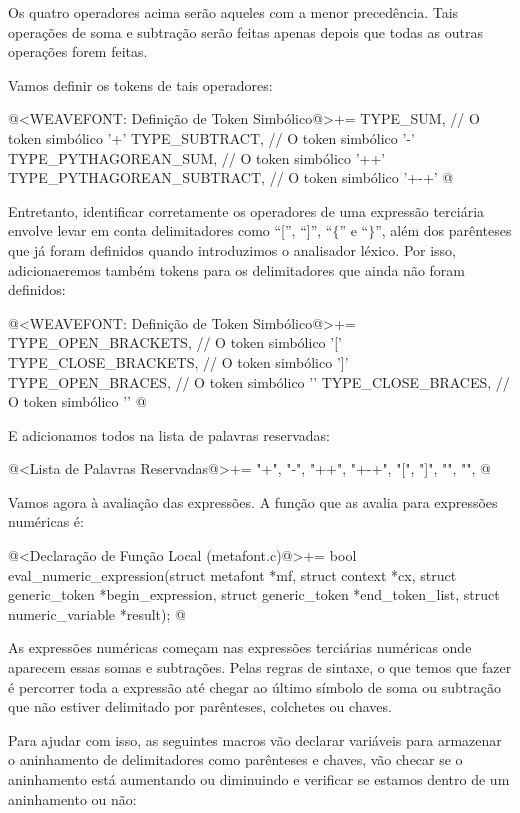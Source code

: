 Os quatro operadores acima serão aqueles com a menor precedência. Tais
operações de soma e subtração serão feitas apenas depois que todas as
outras operações forem feitas.

Vamos definir os tokens de tais operadores:

\iniciocodigo
@<WEAVEFONT: Definição de Token Simbólico@>+=
TYPE_SUM,                   // O token simbólico '+'
TYPE_SUBTRACT,              // O token simbólico '-'
TYPE_PYTHAGOREAN_SUM,       // O token simbólico '++'
TYPE_PYTHAGOREAN_SUBTRACT,  // O token simbólico '+-+'
@
\fimcodigo

Entretanto, identificar corretamente os operadores de uma expressão
terciária envolve levar em conta delimitadores como ``['', ``]'',
``$\{$'' e ``$\}$'', além dos parênteses que já foram definidos quando
introduzimos o analisador léxico. Por isso, adicionaeremos também
tokens para os delimitadores que ainda não foram definidos:

\iniciocodigo
@<WEAVEFONT: Definição de Token Simbólico@>+=
TYPE_OPEN_BRACKETS,         // O token simbólico '['
TYPE_CLOSE_BRACKETS,        // O token simbólico ']'
TYPE_OPEN_BRACES,           // O token simbólico '{'
TYPE_CLOSE_BRACES,          // O token simbólico '}'
@
\fimcodigo

E adicionamos todos na lista de palavras reservadas:

\iniciocodigo
@<Lista de Palavras Reservadas@>+=
"+", "-", "++", "+-+", "[", "]", "{", "}",
@
\fimcodigo

Vamos agora à avaliação das expressões. A função que as avalia para
expressões numéricas é:

\iniciocodigo
@<Declaração de Função Local (metafont.c)@>+=
bool eval_numeric_expression(struct metafont *mf, struct context *cx,
                             struct generic_token *begin_expression,
                             struct generic_token *end_token_list,
                             struct numeric_variable *result);
@
\fimcodigo

As expressões numéricas começam nas expressões terciárias numéricas
onde aparecem essas somas e subtrações. Pelas regras de sintaxe, o que
temos que fazer é percorrer toda a expressão até chegar ao último
símbolo de soma ou subtração que não estiver delimitado por
parênteses, colchetes ou chaves.

Para ajudar com isso, as seguintes macros vão declarar variáveis para
armazenar o aninhamento de delimitadores como parênteses e chaves, vão
checar se o aninhamento está aumentando ou diminuindo e verificar se
estamos dentro de um aninhamento ou não:

